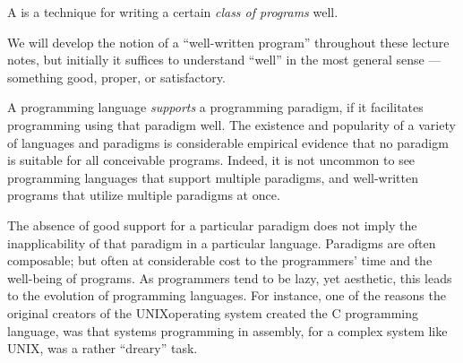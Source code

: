 
\begin{definition}

A  is a technique for writing a certain \emph{class
of programs} well.

\end{definition}

We will develop the notion of a ``well-written program''
throughout these lecture notes, but initially it suffices to understand
``well'' in the most general sense --- something good, proper, or satisfactory.

A programming language \emph{supports} a programming paradigm, if it
facilitates programming using that paradigm well. The existence and popularity
of a variety of languages and paradigms is considerable empirical evidence that
no paradigm is suitable for all conceivable programs. Indeed, it is not
uncommon to see programming languages that support multiple paradigms, and
well-written programs that utilize multiple paradigms at once.

The absence of good support for a particular paradigm does not imply the
inapplicability of that paradigm in a particular language.  Paradigms are often
composable; but often at considerable cost to the programmers' time and the
well-being of programs. As programmers tend to be lazy, yet aesthetic, this
leads to the evolution of programming languages. For instance, one of the
reasons the original creators of the
UNIX\textsuperscript{\textregistered}\footnotemark operating system created the
C programming language, was that systems programming in assembly, for a complex
system like UNIX\textsuperscript{\textregistered}, was a rather ``dreary''
task\cite{the-development-of-c}.





